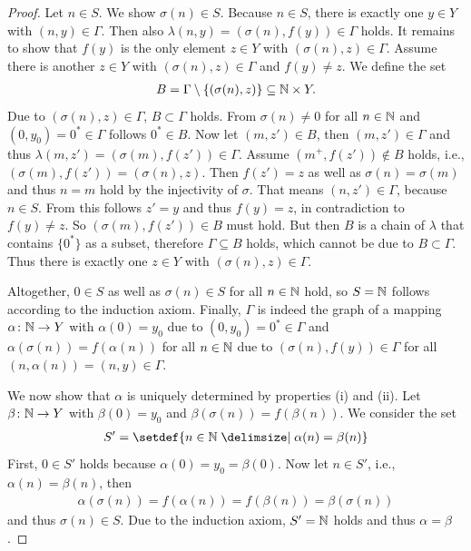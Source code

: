 \begin{proof}
     Let $n\in S$. We show $\sigma(n)\in S$.
    Because $n\in S$, there is exactly one $y\in Y$ with $(n,y)\in\Gamma$. Then also $\lambda(n,y)=(\sigma(n),f(y))\in\Gamma$ holds.
    It remains to show that $f(y)$ is the only element $z\in Y$ with $(\sigma(n),z)\in\Gamma$. Assume there is another $z\in Y$ with $(\sigma(n),z)\in\Gamma$ and $f(y)\neq z$.
    We define the set
    \begin{align}B=\Gamma\setminus\{(\sigma(n),z)\}\subseteq\mathbb{N}\times Y.\end{align}
    Due to $(\sigma(n),z)\in\Gamma$, $B\subset \Gamma$ holds.
    From $\sigma(n)\neq 0$ for all $n\in\mathbb{N}$ and $(0,y_0)=0^*\in \Gamma$ follows $0^*\in B$. Now let $(m,z')\in B$, then $(m,z')\in\Gamma$ and thus $\lambda(m,z')=(\sigma(m),f(z'))\in\Gamma$.
    Assume $(m^+,f(z'))\notin B$ holds, i.e., $(\sigma(m),f(z'))=(\sigma(n),z)$. Then $f(z')=z$ as well as $\sigma(n)=\sigma(m)$ and thus $n=m$ hold by the injectivity of $\sigma$.
    That means $(n,z')\in\Gamma$, because $n\in S$. From this follows $z'=y$ and thus $f(y)=z$, in contradiction to $f(y)\neq z$. So $(\sigma(m),f(z'))\in B$ must hold. But then $B$ is a chain of $\lambda$ that contains $\{0^*\}$ as a subset, therefore $\Gamma\subseteq B$ holds, which cannot be due to $B\subset\Gamma$. Thus there is exactly one $z\in Y$ with $(\sigma(n),z)\in\Gamma$.

    Altogether, $0\in S$ as well as $\sigma(n)\in S$ for all $n\in\mathbb{N}$ hold, so $S=\mathbb{N}$ follows according to the induction axiom. Finally, $\Gamma$ is indeed the graph of a mapping $\alpha\colon\mathbb{N}\rightarrow Y$ with $\alpha(0)=y_0$ due to $(0,y_0)=0^*\in\Gamma$ and $\alpha(\sigma(n))=f(\alpha(n))$ for all $n\in\mathbb{N}$ due to $(\sigma(n),f(y))\in\Gamma$ for all $(n,\alpha(n))=(n,y)\in\Gamma$.

     We now show that $\alpha$ is uniquely determined by properties (i) and (ii).
    Let $\beta\colon\mathbb{N}\rightarrow Y$ with $\beta(0)=y_0$ and $\beta(\sigma(n))=f(\beta(n))$. We consider the set
    \begin{align}S'=\setdef{n\in\setN\given \alpha(n)=\beta(n)}\end{align}
    First, $0\in S'$ holds because $\alpha(0)=y_0=\beta(0)$.
    Now let $n\in S'$, i.e., $\alpha(n)=\beta(n)$, then \begin{align}\alpha(\sigma(n))=f(\alpha(n))=f(\beta(n))=\beta(\sigma(n))\end{align}
    and thus $\sigma(n)\in S$.
    Due to the induction axiom, $S'=\mathbb{N}$ holds and thus $\alpha=\beta$.
\end{proof}

